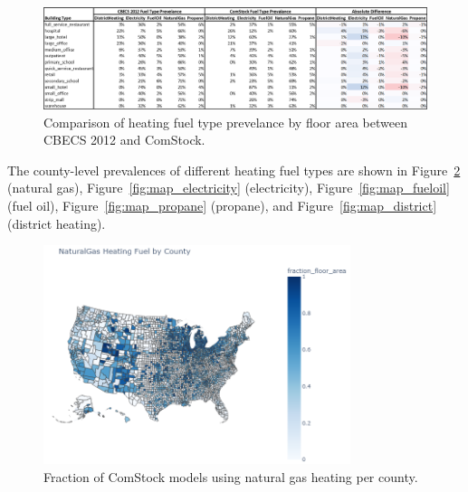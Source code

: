 \begin{figure}
  \centering
  \includegraphics[width=1.10\textwidth]{figures/cbecs_comstock_fuel_type_comparison.png}
  \caption[Comparison of heating fuel type prevelance by floor area between CBECS 2012 and ComStock.]{Comparison of heating fuel type prevelance by floor area between CBECS 2012 and ComStock.}
  \label{fig:fuel_cbecs_v_cstock}
\end{figure}

The county-level prevalences of different heating fuel types are shown in Figure~\ref{fig:map_naturalgas} (natural gas), Figure~\ref{fig:map_electricity} (electricity), Figure~\ref{fig:map_fueloil} (fuel oil), Figure~\ref{fig:map_propane} (propane), and Figure~\ref{fig:map_district} (district heating).

\begin{figure}
  \centering
  \includegraphics[width=0.8\textwidth]{figures/map_naturalgas.png}
  \caption[Fraction of ComStock models using natural gas heating/water heating per county]{Fraction of ComStock models using natural gas heating per county.}
  \label{fig:map_naturalgas}
\end{figure}

